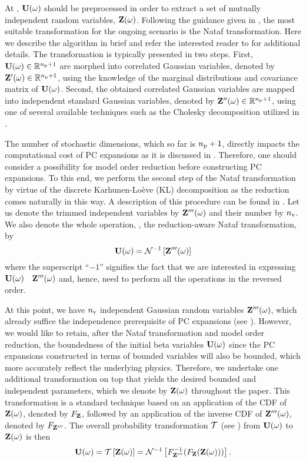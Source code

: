 At , $\mathbf{U}(\omega)$ should be preprocessed in order to extract a set of mutually independent random variables, $\mathbf{Z}(\omega)$.
Following the guidance given in , the most suitable transformation for the ongoing scenario is the Nataf transformation.
Here we describe the algorithm in brief and refer the interested reader to \cite{li2008} for additional details.
The transformation is typically presented in two steps.
First, $\mathbf{U}(\omega) \in \mathbb{R}^{{n_\text{p}} + 1}$ are morphed into correlated Gaussian variables, denoted by $\mathbf{Z}'(\omega) \in \mathbb{R}^{{n_\text{p}} + 1}$, using the knowledge of the marginal distributions and covariance matrix of $\mathbf{U}(\omega)$.
Second, the obtained correlated Gaussian variables are mapped into independent standard Gaussian variables, denoted by $\mathbf{Z}''(\omega) \in \mathbb{R}^{{n_\text{p}} + 1}$, using one of several available techniques such as the Cholesky decomposition \cite{press2007} utilized in \cite{li2008}.

The number of stochastic dimensions, which so far is ${n_\text{p}} + 1$, directly impacts the computational cost of PC expansions as it is discussed in .
Therefore, one should consider a possibility for model order reduction before constructing PC expansions.
To this end, we perform the second step of the Nataf transformation by virtue of the discrete Karhunen-Lo\`{e}ve (KL) decomposition \cite{ghanem1991} as the reduction comes naturally in this way.
A description of this procedure can be found in .
Let us denote the trimmed independent variables by $\mathbf{Z}'''(\omega)$ and their number by ${n_\text{v}}$.
We also denote the whole operation, \ie, the reduction-aware Nataf transformation, by
\[
  \mathbf{U}(\omega) = \mathcal{N}^{-1}\left[\mathbf{Z}'''(\omega)\right]
\]
where the superscript ``$-1$'' signifies the fact that we are interested in expressing $\mathbf{U}(\omega)$ \via\ $\mathbf{Z}'''(\omega)$ and, hence, need to perform all the operations in the reversed order.

At this point, we have ${n_\text{v}}$ independent Gaussian random variables $\mathbf{Z}'''(\omega)$, which already suffice the independence prerequisite of PC expansions (see ).
However, we would like to retain, after the Nataf transformation and model order reduction, the boundedness of the initial beta variables $\mathbf{U}(\omega)$ since the PC expansions constructed in terms of bounded variables will also be bounded, which more accurately reflect the underlying physics.
Therefore, we undertake one additional transformation on top that yields the desired bounded and independent parameters, which we denote by $\mathbf{Z}(\omega)$ throughout the paper.
This transformation is a standard technique \cite{durrett2010} based on an application of the CDF of $\mathbf{Z}(\omega)$, denoted by $F_{\mathbf{Z}}$, followed by an application of the inverse CDF of $\mathbf{Z}'''(\omega)$, denoted by $F_{\mathbf{Z}'''}$.
The overall probability transformation $\oTransform$ (see ) from $\mathbf{U}(\omega)$ to $\mathbf{Z}(\omega)$ is then
\[
  \vU(\o) = \oTransform{\vZ(\o)} = \oInvNataf{\fCDF^{-1}_{\vZ'''}(\fCDF_{\vZ}(\vZ(\o)))}.
\]
